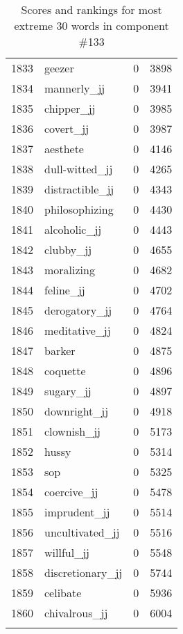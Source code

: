 \begin{longtable}[!htbp]{| rlr@{.}l |}
    1833 & geezer & 0 & 3898 \\
    1834 & mannerly\_jj & 0 & 3941 \\
    1835 & chipper\_jj & 0 & 3985 \\
    1836 & covert\_jj & 0 & 3987 \\
    1837 & aesthete & 0 & 4146 \\
    1838 & dull-witted\_jj & 0 & 4265 \\
    1839 & distractible\_jj & 0 & 4343 \\
    1840 & philosophizing & 0 & 4430 \\
    1841 & alcoholic\_jj & 0 & 4443 \\
    1842 & clubby\_jj & 0 & 4655 \\
    1843 & moralizing & 0 & 4682 \\
    1844 & feline\_jj & 0 & 4702 \\
    1845 & derogatory\_jj & 0 & 4764 \\
    1846 & meditative\_jj & 0 & 4824 \\
    1847 & barker & 0 & 4875 \\
    1848 & coquette & 0 & 4896 \\
    1849 & sugary\_jj & 0 & 4897 \\
    1850 & downright\_jj & 0 & 4918 \\
    1851 & clownish\_jj & 0 & 5173 \\
    1852 & hussy & 0 & 5314 \\
    1853 & sop & 0 & 5325 \\
    1854 & coercive\_jj & 0 & 5478 \\
    1855 & imprudent\_jj & 0 & 5514 \\
    1856 & uncultivated\_jj & 0 & 5516 \\
    1857 & willful\_jj & 0 & 5548 \\
    1858 & discretionary\_jj & 0 & 5744 \\
    1859 & celibate & 0 & 5936 \\
    1860 & chivalrous\_jj & 0 & 6004 \\
    \hline
    \caption{Scores and rankings for most extreme 30 words in component \#133} \\
\end{longtable}
